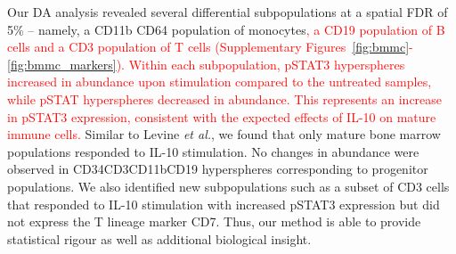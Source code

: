 \documentclass{article}
\newcommand\revised[1]{\textcolor{red}{#1}}
\begin{document}
Our DA analysis revealed several differential subpopulations at a spatial FDR of 5\% -- namely, a CD11b\hi{} CD64\hi{} population of monocytes\revised{, a CD19\hi{} population of B cells and a CD3\hi{} population of T cells (Supplementary Figures~\ref{fig:bmmc}-\ref{fig:bmmc_markers}).
Within each subpopulation, pSTAT3\hi{} hyperspheres increased in abundance upon stimulation compared to the untreated samples, while pSTAT\lo{} hyperspheres decreased in abundance.
This represents an increase in pSTAT3 expression, consistent with the expected effects of IL-10 on mature immune cells.}
Similar to Levine \textit{et al.}, we found that only mature bone marrow populations responded to IL-10 stimulation.
No changes in abundance were observed in CD34\hi{}CD3\lo{}CD11b\lo{}CD19\lo{} hyperspheres corresponding to progenitor populations.
We also identified new subpopulations such as a subset of CD3\hi{} cells that responded to IL-10 stimulation with increased pSTAT3 expression but did not express the T lineage marker CD7.
Thus, our method is able to provide statistical rigour as well as additional biological insight.
\end{document}
